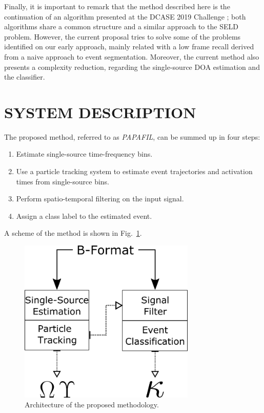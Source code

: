 Finally, it is important to remark that the method described here is the continuation of an algorithm presented at the DCASE 2019 Challenge \cite{perez2019hybrid}; both algorithms share a common structure and a similar approach to the SELD problem. 
However, the current proposal tries to solve some of the problems identified on our early approach, mainly related with a low frame recall derived from a naive approach to event segmentation. Moreover, the current method also presents a complexity reduction, regarding the single-source 
DOA estimation and the classifier. 


\section{SYSTEM DESCRIPTION}
\label{sec:methodology}

The proposed method, referred to as \textit{PAPAFIL}, can be summed up in four steps:

\begin{enumerate}
    \item Estimate single-source time-frequency bins.
    \item Use a particle tracking system to estimate event trajectories and activation times from single-source bins.
    \item Perform spatio-temporal filtering on the input signal.
    \item Assign a class label to the estimated event.
\end{enumerate}

A scheme of the method is shown in Fig.~\ref{fig:scheme}.

\begin{figure}[th!]
  \centering
  \centerline{\includegraphics[width=0.75\textwidth]{Figures/SELD/ARCH.png}}
  \caption{Architecture of the proposed methodology.}
  \label{fig:scheme}
\end{figure}



